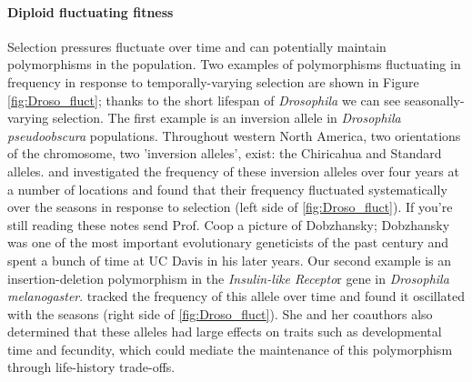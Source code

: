 

\paragraph{Diploid fluctuating fitness}

Selection pressures fluctuate over time and can potentially maintain
polymorphisms in the population. Two examples of polymorphisms
fluctuating in frequency in response to temporally-varying selection are shown in Figure \ref{fig:Droso_fluct}; thanks to the short
lifespan of {\it Drosophila} we can see seasonally-varying
selection. The first example is an inversion allele in {\it Drosophila pseudoobscura} populations. Throughout western North America, two orientations of the
chromosome, two 'inversion alleles', exist: the Chiricahua and Standard
alleles. \citet{dobzhansky1943} and \citet{wright:46}
investigated the frequency of these inversion alleles over
four years at a number of locations and found that their frequency
fluctuated systematically over the seasons in response to
selection (left side of \ref{fig:Droso_fluct}). If you're still
reading these notes send Prof. Coop a picture of Dobzhansky;
Dobzhansky was one of the most important evolutionary geneticists of
the past century and spent a bunch of time at UC Davis in his later years. Our second example is an insertion-deletion polymorphism in
the {\it Insulin-like Recepto}r gene in {\it Drosophila melanogaster}. \citet{paaby:14} tracked the
frequency of this allele over time and found it oscillated with the
seasons (right side of \ref{fig:Droso_fluct}). She and her coauthors
also determined that these alleles had large effects on traits such as
developmental time and fecundity, which could mediate the maintenance of this polymorphism through life-history trade-offs.


